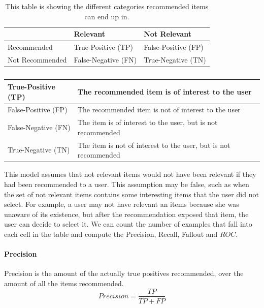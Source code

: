 \begin{table}[H]
	\centering
	\begin{tabular}{l|l|l}
					&	Relevant			&	Not Relevant \\ \hline
	Recommended		&	True-Positive (TP) 	&	False-Positive (FP)	\\ \hline
	Not Recommended	&	False-Negative (FN)	&	True-Negative (TN)	\\ \hline
	\end{tabular}
	\label{table:usageprediction}
	\caption[Usage prediction (Confusion Matrix)]{This table is showing the different categories recommended items can end up in.}
\end{table}

\begin{table}[H]
	\centering
	\begin{tabular}{l|l}
		True-Positive (TP)	& The recommended item is of interest to the user \\ \hline
		False-Positive (FP)	& The recommended item is not of interest to the user \\ \hline
		False-Negative (FN)	& The item is of interest to the user, but is not recommended \\ \hline
		True-Negative (TN)	& The item is not of interest to the user, but is not recommended \\
	\end{tabular}
	\label{table:predictionCategories}
	\caption[Prediction Categories]{}
\end{table}

This model assumes that not relevant items would not have been relevant if they had been
recommended to a user. This assumption may be false, such as when the set of
not relevant items contains some interesting items that the user did not select. For
example, a user may not have relevant an items because she was unaware of its
existence, but after the recommendation exposed that item, the user can decide
to select it. We can count the number of examples that fall into each cell in
the table and compute the Precision, Recall, Fallout and $ROC$.

\paragraph{Precision}
Precision is the amount of the actually true positives recommended, over the amount of all the items recommended.
\begin{equation}
    Precision = \frac{TP}{TP+FP}
    \label{equation:precision}
\end{equation}

